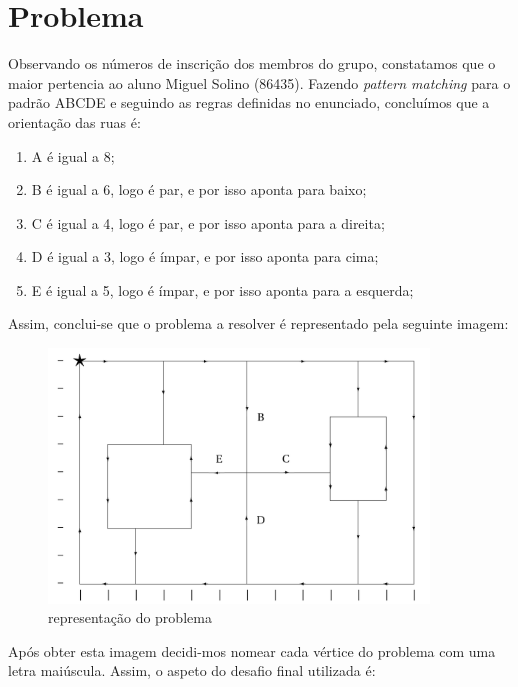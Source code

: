 \documentclass[a4paper]{report}
\begin{document}
\chapter{Problema}
Observando os números de inscrição dos membros do grupo, constatamos
que o maior pertencia ao aluno Miguel Solino (86435).
Fazendo \textit{pattern matching} para o padrão ABCDE e seguindo as
regras definidas no enunciado, concluímos que a orientação das ruas é:

\begin{enumerate}
    \item A é igual a 8;
    \item B é igual a 6, logo é par, e por isso aponta para baixo;
    \item C é igual a 4, logo é par, e por isso aponta para a direita;
    \item D é igual a 3, logo é ímpar, e por isso aponta para cima;
    \item E é igual a 5, logo é ímpar, e por isso aponta para a 
        esquerda;
\end{enumerate}
Assim, conclui-se que o problema a resolver é representado pela
seguinte imagem:

\begin{figure}[H]
    \begin{center}
        \includegraphics[width=0.9\textwidth]{images/desafio.png}\par
        \caption{representação do problema}
        \label{fig:problem}
    \end{center}
\end{figure}
Após obter esta imagem decidi-mos nomear cada vértice do problema com
uma letra maiúscula. Assim, o aspeto do desafio final utilizada é:
\end{document}
